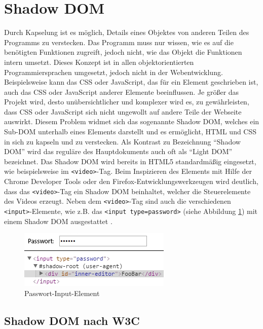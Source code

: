 \section{Shadow DOM}\label{shadow-dom}

Durch Kapselung ist es möglich, Details eines Objektes von anderen Teilen des Programms zu verstecken. Das Programm muss nur wissen, wie es auf die benötigten Funktionen zugreift, jedoch nicht, wie das Objekt die Funktionen intern umsetzt. Dieses Konzept ist in allen objektorientierten Programmiersprachen umgesetzt, jedoch nicht in der Webentwicklung. Beispielsweise kann das CSS oder JavaScript, das für ein Element geschrieben ist, auch das CSS oder JavaScript anderer Elemente beeinflussen. Je größer das Projekt wird, desto unübersichtlicher und komplexer wird es, zu gewährleisten, dass CSS oder JavaScript sich nicht ungewollt auf andere Teile der Webseite auswirkt. Diesem Problem widmet sich das sogenannte Shadow DOM, welches ein Sub-DOM unterhalb eines Elements darstellt und es ermöglicht, HTML und CSS in sich zu kapseln und zu verstecken. Als Kontrast zu Bezeichnung ``Shadow DOM'' wird das reguläre des Hauptdokuments auch oft als ``Light DOM'' bezeichnet. Das Shadow DOM wird bereits in HTML5 standardmäßig eingesetzt, wie beispielsweise im \texttt{\textless{}video\textgreater{}}-Tag. Beim Inspizieren des Elements mit Hilfe der Chrome Developer Tools oder den Firefox-Entwicklungswerkzeugen wird deutlich, dass das \texttt{\textless{}video\textgreater{}}-Tag ein Shadow DOM beinhaltet, welcher die Steuerelemente des Videos erzeugt. Neben dem \texttt{\textless{}video\textgreater{}}-Tag sind auch die verschiedenen \texttt{\textless{}input\textgreater{}}-Elemente, wie z.B. das \texttt{\textless{}input\ type=\dq password\dq \textgreater{}} (siehe Abbildung \ref{fig:itpelem}) mit einem Shadow DOM ausgestattet \cite[S. 109-126]{citeulike:13844975}.

\begin{figure}[htbp]
 \centering
 \includegraphics{kapitel2/bilder/3-shadow-dom-input-type-password}
 \caption{Passwort-Input-Element}
 \label{fig:itpelem}
\end{figure}


\subsection{Shadow DOM nach W3C}\label{shadow-dom-nach-w3c}

